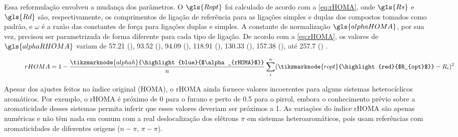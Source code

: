 Essa reformulação envolveu a mudança dos parâmetros. O $\gls{Ropt}$ foi calculado de acordo com a \autoref{eq:rHOMA}, onde $\gls{Rs}$ e $\gls{Rd}$ são, respectivamente, os comprimentos de ligação de referência para as ligações simples e duplas dos compostos tomados como padrão, e $\omega$ é a razão das constantes de força para ligações duplas e simples. A constante de normalização $\gls{alphaHOMA}$, por sua vez, precisou ser parametrizada de forma diferente para cada tipo de ligação.
De acordo com a \autoref{eq:rHOMA}, os valores de $\gls{alphaRHOMA}$ variam de 57.21 (), 93.52 (), 94.09 (), 118.91 (), 130.33 (), 157.38 (), até 257.7 () \autocite{Krygowski2000, krygowski2001}.


\begin{figure}[htb]
    \vspace{3\baselineskip}
\begin{equation}
    \label{eq:rHOMA}
    rHOMA = 1 - \frac{\tikzmarknode{alphah}{\highlight{blue}{$\alpha_{rHOMA}$}}}{n} \sum_i^n (\tikzmarknode{ropt}{\highlight{red}{$R_{opt}$}} - R_i)^2
\end{equation}
\vspace{2\baselineskip}
\end{figure}

Apesar dos ajustes feitos no índice original (\gls{HOMA}), o \gls{rHOMA} ainda fornece valores incoerentes para alguns sistemas heterocíclicos aromáticos. Por exemplo, o \gls{rHOMA} é próximo de 0 para o furano e perto de 0.5 para o pirrol, embora o conhecimento prévio sobre a aromaticidade desses sistemas permita inferir que esses valores deveriam ser próximos a 1. As variações do índice \gls{rHOMA} são
apenas numéricas e não têm nada em comum com a real deslocalização dos elétrons $\pi$ em sistemas heteroaromáticos, pois usam referências com aromaticidades de diferentes origens ($n-\pi$, $\pi-\pi$).

